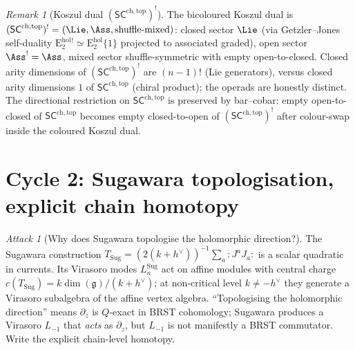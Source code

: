 \documentclass{article}
\theoremstyle{definition}
\theoremstyle{remark}
\newtheorem{remark}[theorem]{Remark}
\newtheorem{attack}[theorem]{Attack}
\newcommand{\SCchtop}{\mathsf{SC}^{\mathrm{ch,top}}}
\newcommand{\Ehol}[1]{\mathrm{E}_{#1}^{\mathrm{hol}}}
\newcommand{\fg}{\mathfrak{g}}
\newcommand{\Sug}{T_{\mathrm{Sug}}}
\newcommand{\hv}{h^{\vee}}
\newcommand{\nord}[1]{{:}#1{:}}
\begin{document}
\begin{remark}[Koszul dual $(\SCchtop)^{!}$]\label{rem:sc-koszul-dual}
The bicoloured Koszul dual is
$(\SCchtop)^{!} = (\Lie, \Ass, \text{shuffle-mixed})$: closed sector
$\Lie$ (via Getzler--Jones self-duality
$\Ehol{2}^{!} \simeq \Ehol{2}\{1\}$ projected to associated graded),
open sector $\Ass^! = \Ass$, mixed sector shuffle-symmetric with
empty open-to-closed. Closed arity dimensions of $(\SCchtop)^!$ are
$(n-1)!$ (Lie generators), versus closed arity dimensions $1$ of
$\SCchtop$ (chiral product); the operads are honestly distinct.
The directional restriction on $\SCchtop$ is preserved by bar--cobar:
empty open-to-closed of $\SCchtop$ becomes empty closed-to-open of
$(\SCchtop)^{!}$ after colour-swap inside the coloured Koszul dual.
\end{remark}

\section{Cycle 2: Sugawara topologisation, explicit chain homotopy}
\label{sec:cycle-2}

\begin{attack}[Why does Sugawara topologise the holomorphic
direction?]
The Sugawara construction
$\Sug = (2(k+\hv))^{-1}\sum_a \nord{J^a J_a}$
is a scalar quadratic in currents. Its Virasoro modes
$L^{\mathrm{Sug}}_{n}$ act on affine modules with central charge
$c(\Sug) = k\dim(\fg)/(k+\hv)$; at non-critical level $k\neq -\hv$
they generate a Virasoro subalgebra of the affine vertex algebra.
``Topologising the holomorphic direction'' means $\partial_z$ is
$Q$-exact in BRST cohomology; Sugawara produces a Virasoro $L_{-1}$
that \emph{acts} as $\partial_z$, but $L_{-1}$ is not manifestly a
BRST commutator. Write the explicit chain-level homotopy.
\end{attack}
\end{document}
